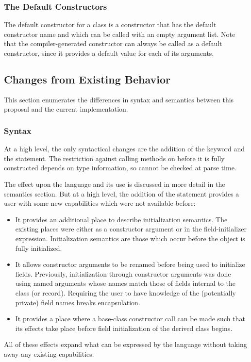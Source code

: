 \subsubsection{The Default Constructors}
\label{Default_Constructors}

The default constructor for a class is a constructor that has the default
constructor name and which can be called with an empty argument list.  Note that
the compiler-generated constructor can always be called as a default
constructor, since it provides a default value for each of its arguments.

\subsection{Changes from Existing Behavior}

This section enumerates the differences in syntax and semantics between this
proposal and the current implementation.

\subsubsection{Syntax}

At a high level, the only syntactical changes are the addition of
the  keyword and the  statement.
The restriction against calling methods
on  before it is fully constructed depends on type information, so
cannot be checked at parse time.

The effect upon the language and its use is discussed in more detail in the
semantics section.  But at a high level, the addition of
the  statement provides a user with some new capabilities
which were not available before:
\begin{itemize}
\item It provides an additional place to describe initialization semantics.  The
existing places were either as a constructor argument or in the
field-initializer expression.  Initialization semantics are those which occur
before the object is fully initialized.
\item It allows constructor arguments to be renamed before being used to
initialize fields.  Previously, initialization
through constructor arguments was done using named arguments whose names match
those of fields internal to the class (or record).  Requiring the user to have
knowledge of the (potentially private) field names breaks encapsulation.
\item It provides a place where a base-class constructor call can be made such
that its effects take place before field initialization of the derived class begins.
\end{itemize}
All of these effects expand what can be expressed by the language without taking
away any existing capabilities.


